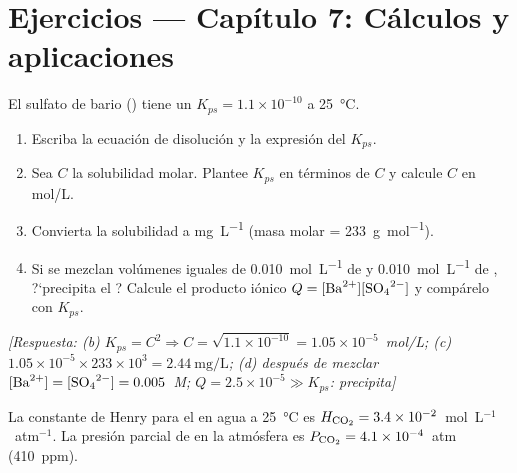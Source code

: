 
\section*{Ejercicios --- Cap\'itulo 7: C\'alculos y aplicaciones}
\label{sec:ejercicios_cap07b}

\begin{bloque_ejercicios}

\begin{ejercicios}

\item El sulfato de bario () tiene un $K_{ps} = 1.1\times10^{-10}$
a \SI{25}{\celsius}.

\begin{enumerate}[label=\alph*)]
    \item Escriba la ecuaci\'on de disoluci\'on y la expresi\'on del
          $K_{ps}$.
    \item Sea $C$ la solubilidad molar. Plantee $K_{ps}$ en t\'erminos
          de $C$ y calcule $C$ en mol/L.
    \item Convierta la solubilidad a \si{\milli\gram\per\liter}
          (masa molar  = \SI{233}{\gram\per\mole}).
    \item Si se mezclan vol\'umenes iguales de \SI{0.010}{\mole\per\liter}
          de  y \SI{0.010}{\mole\per\liter} de ,
          ?`precipita el ? Calcule el producto i\'onico
          $Q = [\ce{Ba^{2+}}][\ce{SO4^{2-}}]$ y comp\'arelo con $K_{ps}$.
\end{enumerate}

\textit{[Respuesta:
(b) $K_{ps} = C^2 \Rightarrow C = \sqrt{1.1\times10^{-10}}
    = 1.05\times10^{-5}$~mol/L;
(c) $1.05\times10^{-5}\times233\times10^3
    = \SI{2.44}{\milli\gram\per\liter}$;
(d) despu\'es de mezclar $[\ce{Ba^{2+}}] = [\ce{SO4^{2-}}]
    = 0.005$~M; $Q = 2.5\times10^{-5} \gg K_{ps}$: precipita]}

\item La constante de Henry para el  en agua a \SI{25}{\celsius}
es $H_{\ce{CO2}} = 3.4\times10^{-2}$~mol~L$^{-1}$~atm$^{-1}$.
La presi\'on parcial de  en la atm\'osfera es
$P_{\ce{CO2}} = 4.1\times10^{-4}$~atm (410~ppm).


\end{ejercicios}
\end{bloque_ejercicios}
